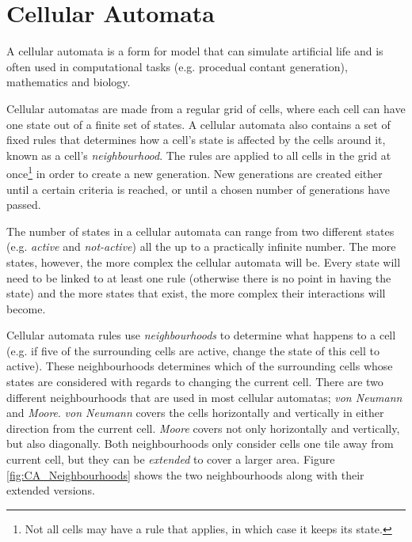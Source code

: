 \section{Cellular Automata}
\label{methodology_ca}
A cellular automata is a form for model that can simulate artificial life and is often used in computational tasks (e.g. procedual contant generation\cite{togelius2011search}), mathematics and biology. 

Cellular automatas are made from a regular grid of cells, where each cell can have one state out of a finite set of states. A cellular automata also contains a set of fixed rules that determines how a cell's state is affected by the cells around it, known as a cell's \textit{neighbourhood}. The rules are applied to all cells in the grid at once\footnote{Not all cells may have a rule that applies, in which case it keeps its state.} in order to create a new generation. New generations are created either until a certain criteria is reached, or until a chosen number of generations have passed.

The number of states in a cellular automata can range from two different states (e.g. \textit{active} and \textit{not-active}) all the up to a practically infinite number. The more states, however, the more complex the cellular automata will be. Every state will need to be linked to at least one rule (otherwise there is no point in having the state) and the more states that exist, the more complex their interactions will become.

Cellular automata rules use \textit{neighbourhoods} to determine what happens to a cell (e.g. if five of the surrounding cells are active, change the state of this cell to active). These neighbourhoods determines which of the surrounding cells whose states are considered with regards to changing the current cell. There are two different neighbourhoods that are used in most cellular automatas; \textit{von Neumann} and \textit{Moore}. \textit{von Neumann} covers the cells horizontally and vertically in either direction from the current cell. \textit{Moore} covers not only horizontally and vertically, but also diagonally. Both neighbourhoods only consider cells one tile away from current cell, but they can be \textit{extended} to cover a larger area. Figure \ref{fig:CA_Neighbourhoods} shows the two neighbourhoods along with their extended versions.


